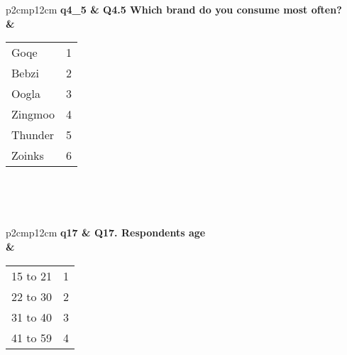 \documentclass[12pt]{article}
\begin{document}
\noindent
\begin{tabular}{p{2cm}p{12cm}}
\bfseries{q4\_5} & \bfseries{Q4.5 Which brand do you consume most often?}\\
& \begin{tabular}{|p{8cm}|p{2cm}|}
\hline
Goqe & 1 \\
Bebzi & 2 \\
Oogla & 3 \\
Zingmoo & 4 \\
Thunder & 5 \\
Zoinks & 6 \\
\hline
\end{tabular}\\
\end{tabular}\\
\noindent
\begin{tabular}{p{2cm}p{12cm}}
\bfseries{q17} & \bfseries{Q17. Respondents age}\\
& \begin{tabular}{|p{8cm}|p{2cm}|}
\hline
15 to 21 & 1 \\
22 to 30 & 2 \\
31 to 40 & 3 \\
41 to 59 & 4 \\
\hline
\end{tabular}\\
\end{tabular}\\
\end{document}
